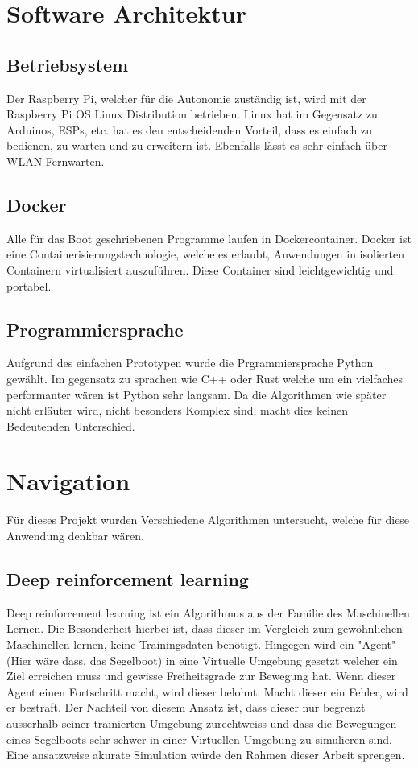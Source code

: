 \section{Software Architektur}
\subsection*{Betriebsystem}
Der Raspberry Pi, welcher für die Autonomie zuständig ist, wird mit der Raspberry Pi OS Linux Distribution betrieben. Linux hat im Gegensatz zu Arduinos, ESPs, etc. hat es den entscheidenden Vorteil, dass es einfach zu bedienen, zu warten und zu erweitern ist. Ebenfalls lässt es sehr einfach über WLAN Fernwarten. 

\subsection*{Docker}
Alle für das Boot geschriebenen Programme laufen in Dockercontainer. Docker ist eine Containerisierungstechnologie, welche es erlaubt, Anwendungen in isolierten Containern virtualisiert auszuführen. Diese Container sind leichtgewichtig und portabel.

\subsection*{Programmiersprache}
Aufgrund des einfachen Prototypen wurde die Prgrammiersprache Python gewählt. Im gegensatz zu sprachen wie C++ oder Rust welche um ein vielfaches performanter wären ist Python sehr langsam. Da die Algorithmen wie später nicht erläuter wird, nicht besonders Komplex sind, macht dies keinen Bedeutenden Unterschied. 


\section{Navigation}
Für dieses Projekt wurden Verschiedene Algorithmen untersucht, welche für diese Anwendung denkbar wären.

\subsection{Deep reinforcement learning}
Deep reinforcement learning ist ein Algorithmus aus der Familie des Maschinellen Lernen. Die Besonderheit hierbei ist, dass dieser im Vergleich zum gewöhnlichen Maschinellen lernen, keine Trainingsdaten benötigt. Hingegen wird ein "Agent" (Hier wäre dass, das Segelboot) in eine Virtuelle Umgebung gesetzt welcher ein Ziel erreichen muss und gewisse Freiheitsgrade zur Bewegung hat. Wenn dieser Agent einen Fortschritt macht, wird dieser belohnt. Macht dieser ein Fehler, wird er bestraft. 
Der Nachteil von diesem Ansatz ist, dass dieser nur begrenzt ausserhalb seiner trainierten Umgebung zurechtweiss und dass die Bewegungen eines Segelboots sehr schwer in einer Virtuellen Umgebung zu simulieren sind. Eine ansatzweise akurate Simulation würde den Rahmen dieser Arbeit sprengen.

